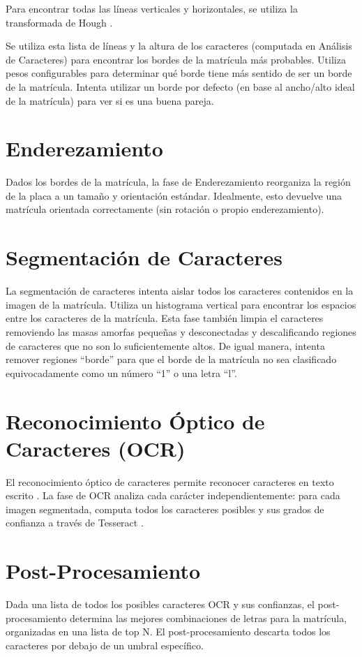 Para encontrar todas las líneas verticales y horizontales, se utiliza la transformada de Hough \cite{OpenCV2016-kr}.

Se utiliza esta lista de líneas y la altura de los caracteres (computada en Análisis de Caracteres) para encontrar los bordes de la matrícula más probables. Utiliza pesos configurables para determinar qué borde tiene más sentido de ser un borde de la matrícula. Intenta utilizar un borde por defecto (en base al ancho/alto ideal de la matrícula) para ver si es una buena pareja.

\section{Enderezamiento}
Dados los bordes de la matrícula, la fase de Enderezamiento reorganiza la región de la placa a un tamaño y orientación estándar. Idealmente, esto devuelve una matrícula orientada correctamente (sin rotación o propio enderezamiento).

\section{Segmentación de Caracteres}
La segmentación de caracteres intenta aislar todos los caracteres contenidos en la imagen de la matrícula. Utiliza un histograma vertical para encontrar los espacios entre los caracteres de la matrícula. Esta fase también limpia el caracteres removiendo las masas amorfas pequeñas y desconectadas y descalificando regiones de caracteres que no son lo suficientemente altos. De igual manera, intenta remover regiones “borde” para que el borde de la matrícula no sea clasificado equivocadamente como un número “1” o una letra “l”. 

\section{Reconocimiento Óptico de Caracteres (OCR)}
El reconocimiento óptico de caracteres permite reconocer caracteres en texto escrito \cite{Mithe2013-yn}. La fase de OCR analiza cada carácter independientemente: para cada imagen segmentada, computa todos los caracteres posibles  y sus grados de confianza a través de Tesseract \cite{Tesseract-OCR2016-fe}.
\section{Post-Procesamiento}
Dada una lista de todos los posibles caracteres OCR y sus confianzas, el post-procesamiento determina las mejores combinaciones de letras para la matrícula, organizadas en una lista de top N. El post-procesamiento descarta todos los caracteres por debajo de un umbral específico. 

